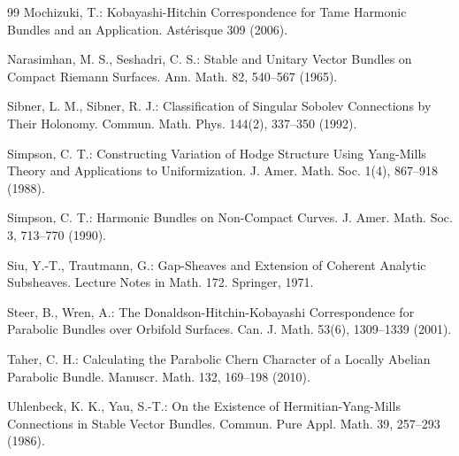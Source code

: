 \documentclass[12pt,a4paper]{article}
\begin{document}
\begin{thebibliography}{99}
Mochizuki, T.: Kobayashi-Hitchin Correspondence for Tame Harmonic Bundles and an Application. Ast\'erisque 309 (2006).

Narasimhan, M. S., Seshadri, C. S.: Stable and Unitary Vector Bundles on Compact Riemann Surfaces. Ann. Math. 82, 540--567 (1965).

Sibner, L. M., Sibner, R. J.: Classification of Singular Sobolev Connections by Their Holonomy. Commun. Math. Phys. 144(2), 337--350 (1992).

Simpson, C. T.: Constructing Variation of Hodge Structure Using Yang-Mills Theory and Applications to Uniformization. J. Amer. Math. Soc. 1(4), 867--918 (1988).

Simpson, C. T.: Harmonic Bundles on Non-Compact Curves. J. Amer. Math. Soc. 3, 713--770 (1990).

Siu, Y.-T., Trautmann, G.: Gap-Sheaves and Extension of Coherent Analytic Subsheaves. Lecture Notes in Math. 172. Springer, 1971.

Steer, B., Wren, A.: The Donaldson-Hitchin-Kobayashi Correspondence for Parabolic Bundles over Orbifold Surfaces. Can. J. Math. 53(6), 1309--1339 (2001).

Taher, C. H.: Calculating the Parabolic Chern Character of a Locally Abelian Parabolic Bundle. Manuscr. Math. 132, 169--198 (2010).

Uhlenbeck, K. K., Yau, S.-T.: On the Existence of Hermitian-Yang-Mills Connections in Stable Vector Bundles. Commun. Pure Appl. Math. 39, 257--293 (1986).

\end{thebibliography}
\end{document}
